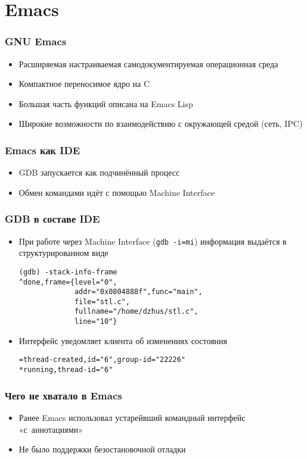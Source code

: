 \documentclass[onlymath]{beamer}
\newcommand\code\texttt
\begin{document}
\section{Emacs}
\begin{frame}
  \frametitle{GNU Emacs}
  \begin{itemize}
  \item Расширяемая настраиваемая самодокументируемая операционная
    среда
  \item Компактное переносимое ядро на C
  \item Большая часть функций описана на Emacs Lisp
  \item Широкие возможности по взаимодействию с окружающей средой
    (сеть, IPC)
  \end{itemize}
\end{frame}

\begin{frame}
  \frametitle{Emacs как IDE}
  \begin{itemize}
  \item GDB запускается как подчинённый процесс
  \item Обмен командами идёт с помощью Machine Interface
  \end{itemize}
\end{frame}

\begin{frame}[fragile]
  \frametitle{GDB в составе IDE}
  \begin{itemize}
  \item При работе через Machine Interface (\code{gdb -i=mi})
    информация выдаётся в структурированном виде
\begin{lstlisting}[style=session]
(gdb) -stack-info-frame
^done,frame={level="0",
             addr="0x0804888f",func="main",
             file="stl.c",
             fullname="/home/dzhus/stl.c",
             line="10"}
\end{lstlisting}
  \item Интерфейс уведомляет клиента об изменениях состояния
\begin{lstlisting}[style=session]
=thread-created,id="6",group-id="22226"
*running,thread-id="6"
\end{lstlisting}
  \end{itemize}
\end{frame}

\begin{frame}
  \frametitle{Чего не хватало в Emacs}
  \begin{itemize}
  \item Ранее Emacs использовал устарейвший командный интерфейс
    «с аннотациями»
  \item Не было поддержки безостановочной отладки
  \end{itemize}  
\end{frame}
\end{document}
